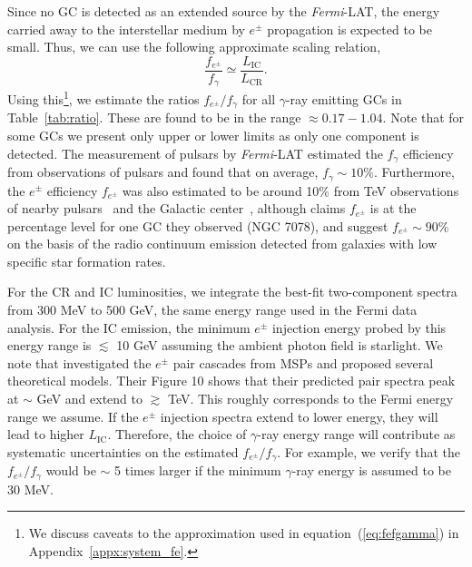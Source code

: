 \documentclass[doublespace,nopageskip]{VTthesis} %
\begin{document}
Since no GC is detected as an extended source by the \textit{Fermi}-LAT, the energy carried away to the interstellar medium by $e^\pm$ propagation is expected to be small. Thus, we can use the following approximate scaling relation,
\begin{equation}\label{eq:fefgamma}
    \dfrac{f_{e^\pm}}{f_\gamma} \simeq \dfrac{L_\mathrm{IC}}{L_\mathrm{CR}}.
\end{equation}
Using this\footnote{We discuss caveats to the approximation used in equation~(\ref{eq:fefgamma}) in Appendix~\ref{appx:system_fe}.}, we estimate the ratios $f_{e^\pm}/f_\gamma$ for all $\gamma$-ray emitting GCs in Table~\ref{tab:ratio}. These are found to be in the range $\approx 0.17 - 1.04$. Note that for some GCs we present only upper or lower limits as only one component is detected. The measurement of pulsars by \textit{Fermi}-LAT estimated the $f_{\gamma}$ efficiency from observations of pulsars and found that on average, $f_\gamma \sim \mathrm{10\%}$. Furthermore, the $e^\pm$ efficiency $f_{e^\pm}$ was also estimated to be around 10\% from TeV observations of {nearby pulsars~\citep{2017PhRvD..96j3013H, 2018PhRvD..98d3005H, 2021arXiv210400014H} and} the Galactic center~\citep{2013MNRAS.435L..14B}, although \citet{2019MNRAS.484.2876M} claims $f_{e^\pm}$ is at the percentage level for one GC they observed (NGC 7078), and \citet{2020arXiv200508982S} suggest $f_{e^\pm} \sim 90\%$ on the basis of the  radio continuum emission detected from galaxies with low specific star formation rates.

For the CR and IC luminosities, we integrate the best-fit two-component spectra from 300 MeV to 500 GeV, the same energy range used in the Fermi data analysis. For the IC emission, the minimum $e^\pm$ injection energy probed by this energy range is $\lesssim$ 10 GeV assuming the ambient photon field is starlight. We note that \citet{2011ApJ...743..181H} investigated the $e^\pm$ pair cascades from MSPs and proposed several theoretical models. Their Figure 10 shows that their predicted pair spectra peak at $\sim$ GeV and extend to $\gtrsim$ TeV. This roughly corresponds to the Fermi energy range we assume. If the $e^\pm$ injection spectra extend to lower energy, they will lead to higher $L_\mathrm{IC}$. Therefore, the choice of $\gamma$-ray energy range will contribute as systematic uncertainties on the estimated $f_{e^\pm}/f_\gamma$. For example, we verify that the $f_{e^\pm}/f_\gamma$ would be $\sim$ 5 times larger if the minimum $\gamma$-ray energy is assumed to be 30 MeV.
\end{document}
